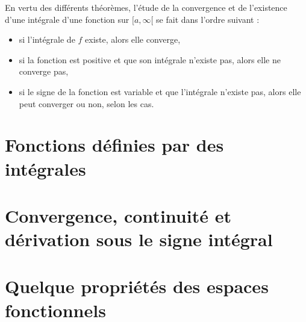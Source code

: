 En vertu des différents théorèmes, l'étude de la convergence et de l'existence d'une intégrale d'une fonction sur $[a,\infty[$ se fait dans l'ordre suivant :
\begin{itemize}
\item si l'intégrale de $f$ existe, alors elle converge,
\item si la fonction est positive et que son intégrale n'existe pas, alors elle ne converge pas,
\item si le signe de la fonction est variable et que l'intégrale n'existe pas, alors elle peut converger ou non, selon les cas.
\end{itemize}

	
					\section{Fonctions définies par des intégrales}




					\section{Convergence, continuité et dérivation sous le signe intégral}

					\section{Quelque propriétés des espaces fonctionnels}


